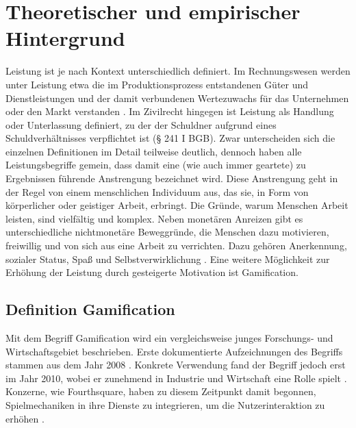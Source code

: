 \section{Theoretischer und empirischer Hintergrund}
Leistung ist je nach Kontext unterschiedlich definiert. Im Rechnungswesen werden unter Leistung etwa die im Produktionsprozess entstandenen Güter und Dienstleistungen und der damit verbundenen Wertezuwachs für das Unternehmen oder den Markt verstanden \cite{woeltje2010abc}. Im Zivilrecht hingegen ist Leistung als Handlung oder Unterlassung definiert, zu der der Schuldner aufgrund eines Schuldverhältnisses verpflichtet ist (§ 241 I BGB). Zwar unterscheiden sich die einzelnen Definitionen im Detail teilweise deutlich, dennoch haben alle Leistungsbegriffe gemein, dass damit eine (wie auch immer geartete) zu Ergebnissen führende Anstrengung bezeichnet wird. Diese Anstrengung geht in der Regel von einem menschlichen Individuum aus, das sie, in Form von körperlicher oder geistiger Arbeit, erbringt. Die Gründe, warum Menschen Arbeit leisten, sind vielfältig und komplex. Neben monetären Anreizen gibt es unterschiedliche nichtmonetäre Beweggründe, die Menschen dazu motivieren, freiwillig und von sich aus eine Arbeit zu verrichten. Dazu gehören Anerkennung, sozialer Status, Spaß und Selbstverwirklichung \cite{shujaat}. Eine weitere Möglichkeit zur Erhöhung der Leistung durch gesteigerte Motivation ist Gamification. 

\subsection{Definition Gamification}
Mit dem Begriff Gamification wird ein vergleichsweise junges Forschungs- und Wirtschaftsgebiet beschrieben. Erste dokumentierte Aufzeichnungen des Begriffs stammen aus dem Jahr 2008 \cite{huotari_defining_2012, deterding_game_2011}. Konkrete Verwendung fand der Begriff jedoch erst im Jahr 2010, wobei er zunehmend in Industrie und Wirtschaft eine Rolle spielt \cite{huotari_defining_2012}. Konzerne, wie Fourthsquare, haben zu diesem Zeitpunkt damit begonnen, Spielmechaniken in ihre Dienste zu integrieren, um die Nutzerinteraktion zu erhöhen \cite{deterding_game_2011}.

